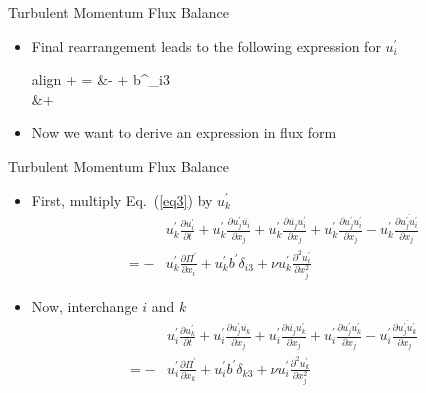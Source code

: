 \begin{frame}{Turbulent Momentum Flux Balance}
\begin{itemize}
  	\item Final rearrangement leads to the following expression for $u_i^\prime$
  	\small
  	\begin{empheq}[box=\widefbox]{align}
  	\label{eq3}
  		 +  = &- + b^\prime\delta_{i3} \\&+ \nu {}\nonumber
  	\end{empheq}
  	\item Now we want to derive an expression in flux form
  \end{itemize}
\end{frame}
\begin{frame}{Turbulent Momentum Flux Balance}
\begin{itemize}
  	\item First, multiply Eq.~(\ref{eq3}) by $u_k^\prime$
  	\small
  	\begin{align}
  	\label{eq4}
  	& u_k^\prime\frac{\partial u_i^\prime}{\partial t} + u_k^\prime\frac{\partial u_j^\prime \overline{u_i}}{\partial x_j} + u_k^\prime\frac{\partial \overline{u_j} u_i^\prime}{\partial x_j} + u_k^\prime\frac{\partial u_j^\prime  u_i^\prime}{\partial x_j} - u_k^\prime\frac{\partial \overline{u_j^\prime u_i^\prime}}{\partial x_j}\\ 
  	= - & u_k^\prime\frac{\partial \Pi^\prime}{\partial x_i} + u_k^\prime b^\prime\delta_{i3} + \nu u_k^\prime \frac{\partial^2 u_i^\prime}{\partial x_j^2}\nonumber	
  	\end{align}
	\item Now, interchange $i$ and $k$
	\small
  	\begin{align}
  	\label{eq5}
  	& u_i^\prime\frac{\partial u_k^\prime}{\partial t} + u_i^\prime\frac{\partial u_j^\prime \overline{u_k}}{\partial x_j} + u_i^\prime\frac{\partial \overline{u_j} u_k^\prime}{\partial x_j} + u_i^\prime\frac{\partial u_j^\prime  u_k^\prime}{\partial x_j} - u_i^\prime\frac{\partial \overline{u_j^\prime  u_k^\prime}}{\partial x_j}\\ 
  	= - & u_i^\prime\frac{\partial \Pi^\prime}{\partial x_k} + u_i^\prime b^\prime\delta_{k3} + \nu u_i^\prime \frac{\partial^2 u_k^\prime}{\partial x_j^2}\nonumber	
  	\end{align}
  \end{itemize}
\end{frame}

